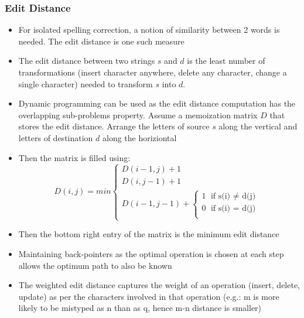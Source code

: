 \documentclass{article}
\begin{document}
\subsubsection{Edit Distance}
\begin{itemize}
    \item For isolated spelling correction, a notion of similarity between 2 words is needed. The edit distance is one such measure
    
    \item The edit distance between two strings $s$ and $d$ is the least number of transformations (insert character anywhere, delete any character, change a single character) needed to transform $s$ into $d$. 
    
    \item Dynamic programming can be used as the edit distance computation has the overlapping sub-problems property. Assume a memoization matrix $D$ that stores the edit distance. Arrange the letters of source $s$ along the vertical and letters of destination $d$ along the horiziontal
    
    \item Then the matrix is filled using:
    \begin{equation*}
        D(i, j) = min \begin{cases}
            D(i-1, j) + 1 \\
            D(i, j-1) + 1 \\
            D(i-1, j-1) + \begin{cases}
                1 \text{ if s(i) $\neq$ d(j)}\\
                0 \text{ if s(i) $=$ d(j)}\\
            \end{cases}
    \end{cases}
    \end{equation*}
    
    \item Then the bottom right entry of the matrix is the minimum edit distance
    
    \item Maintaining back-pointers as the optimal operation is chosen at each step allows the optimum path to also be known
    
    \item The weighted edit distance captures the weight of an operation (insert, delete, update) as per the characters involved in that operation (e.g.: m is more likely to be mistyped as n than as q, hence m-n distance is smaller)
    

\end{itemize}
\end{document}
